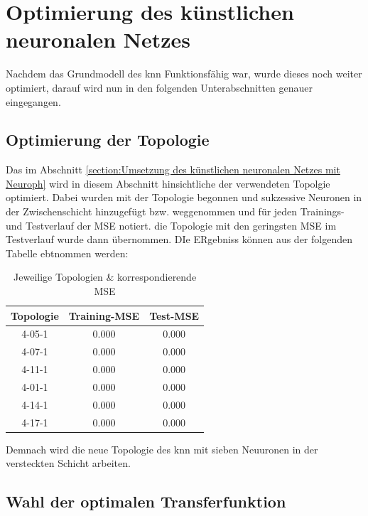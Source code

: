 \section{Optimierung des künstlichen neuronalen Netzes}

Nachdem das Grundmodell des \acs{knn} Funktionsfähig war, wurde dieses noch weiter optimiert, darauf wird nun in den folgenden Unterabschnitten genauer eingegangen. 

\label{section:Optimierung des künstlischen neuronalen Netzes}
\subsection{Optimierung der Topologie}
Das im Abschnitt \ref{section:Umsetzung des künstlichen neuronalen Netzes mit Neuroph} wird in diesem Abschnitt hinsichtliche der verwendeten Topolgie optimiert. Dabei wurden mit der Topologie begonnen und sukzessive Neuronen in der Zwischenschicht hinzugefügt bzw. weggenommen und für jeden Trainings- und Testverlauf der MSE notiert. die Topologie mit den geringsten MSE im Testverlauf wurde dann übernommen. DIe ERgebniss können aus der folgenden Tabelle ebtnommen werden:


\begin{table}[H]
  \centering
  \begin{tabular}{|c|c|c|}
  \hline 
  \rule[0ex]{0pt}{2.5ex} Topologie & Training-MSE & Test-MSE \\ 
  \hline 
  \rule[0ex]{0pt}{2.5ex} 4-05-1 & 0.000 & 0.000 \\ 
  \hline 
  \rule[0ex]{0pt}{2.5ex} 4-07-1 & 0.000 & 0.000 \\ 
  \hline 
  \rule[0ex]{0pt}{2.5ex} 4-11-1 & 0.000 & 0.000 \\ 
  \hline 
   \rule[0ex]{0pt}{2.5ex} 4-01-1 & 0.000 & 0.000 \\ 
  \hline 
  \rule[0ex]{0pt}{2.5ex} 4-14-1 & 0.000 & 0.000 \\ 
  \hline 
  \rule[0ex]{0pt}{2.5ex} 4-17-1 & 0.000 & 0.000 \\ 
  \hline 
  \end{tabular} 
  \caption{Jeweilige Topologien \& korrespondierende MSE}
  \label{tab:TOPMSE}
\end{table}


Demnach wird die neue Topologie des \acs{knn} mit sieben Neuuronen in der versteckten Schicht arbeiten.



\subsection{Wahl der optimalen Transferfunktion} 
\label{subsection:Wahl der optimalen Transferfunktion} 


